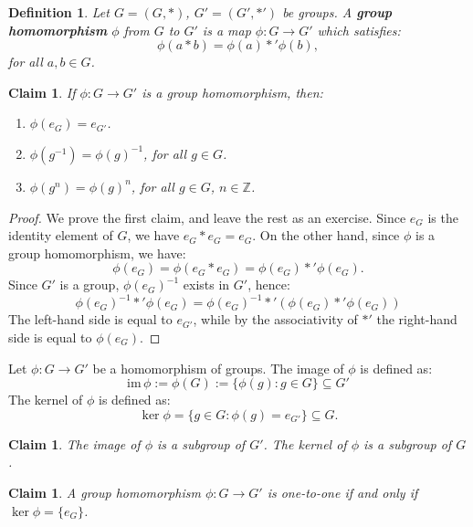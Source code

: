 \documentclass[a4paper,12pt]{report}
\newcommand{\im}{\mathrm{im}\,}
\newcommand{\ra}{\longrightarrow}
\newcounter{statement}
\numberwithin{statement}{chapter}
\newtheorem{defn}[statement]{Definition}
\newtheorem{claim}[statement]{Claim}
\numberwithin{equation}{chapter}
\numberwithin{section}{chapter}
\numberwithin{subsection}{section}
\begin{document}
\begin{defn}
Let $G = (G, *)$, $G' = (G', *')$ be groups.
A  {\bf group homomorphism}  $\phi$ from $G$ to $G'$
is a map $\phi: G \ra G'$ which satisfies:
\[\phi(a * b) = \phi(a)*'\phi(b),\]
for all $a, b \in G$.
\end{defn}
\begin{claim}

If $\phi: G \ra G'$ is a group homomorphism, then:
\begin{enumerate}
\item 
$\phi(e_G) = e_{G'}$.

\item 
$\phi(g^{-1}) = \phi(g)^{-1}$, for all $g \in G$.

\item 
$\phi(g^n) = \phi(g)^n$, for all $g \in G$, $n \in \mathbb{Z}$.
\end{enumerate}
\end{claim}
\begin{proof}

We prove the first claim, and leave the rest as an exercise.
Since $e_G$ is the identity element of $G$, we have $e_G*e_G = e_G$.
On the other hand, since $\phi$ is a group homomorphism, we have:
\[\phi(e_G) =
\phi(e_G*e_G) = \phi(e_G)*'\phi(e_G).\]
Since $G'$ is a group, $\phi(e_G)^{-1}$ exists in $G'$, hence:
\[\phi(e_G)^{-1}*'\phi(e_G) = \phi(e_G)^{-1}*'(\phi(e_G)*'\phi(e_G))\]
The left-hand side is equal to $e_{G'}$, while by the associativity of $*'$
the right-hand side is equal to $\phi(e_G)$.

\end{proof}

Let $\phi: G \ra G'$ be a homomorphism of groups.
The image of $\phi$ is defined as:
\[\im \phi:= \phi(G):= \{\phi(g): g \in G\} \subseteq G'\]
The kernel of $\phi$ is defined as:
\[\ker \phi = \{g \in G: \phi(g) = e_{G'}\} \subseteq G.\]
\begin{claim}

The image of $\phi$ is a subgroup of $G'$.
The kernel of $\phi$ is a subgroup of $G$.
\end{claim}
\begin{claim}

A group homomorphism $\phi: G \ra G'$ is one-to-one if and only if $\ker \phi = \{e_G\}$.
\end{claim}
\end{document}
